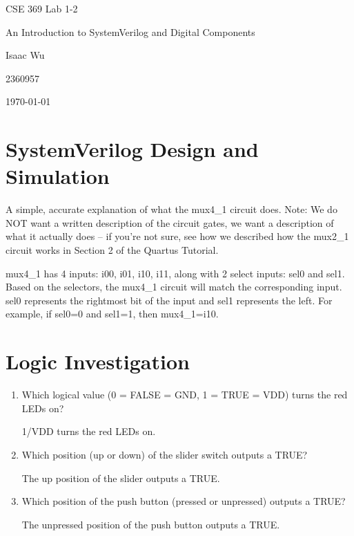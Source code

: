 \documentclass{article}
\date{}
\newenvironment{solution}{\begin{mdframed}[style=SolutionFrame]}{\end{mdframed}}
\begin{document}
    \begin{titlepage}
        \centering
        \null
        \vspace{5cm}
        {\Huge CSE 369 Lab 1-2\par}
        \vspace{0.5cm}
        {\Large An Introduction to SystemVerilog and Digital Components \par}
        \vfill
        {\hfill \Large Isaac Wu \par}
        {\hfill \large 2360957 \par}
        {\hfill \large \today \par}
    \end{titlepage}

\section{SystemVerilog Design and Simulation}
    A simple, accurate explanation of what the mux4\_1 circuit does. Note: We do NOT want a written description of the circuit gates, we want a description of what it actually does – if you're not sure, see how we described how the mux2\_1 circuit works in Section 2 of the Quartus Tutorial.
    \begin{solution}
        mux4\_1 has 4 inputs: i00, i01, i10, i11, along with 2 select inputs: sel0 and sel1. Based on the selectors, the mux4\_1 circuit will match the corresponding input. sel0 represents the rightmost bit of the input and sel1 represents the left. For example, if sel0=0 and sel1=1, then mux4\_1=i10.
    \end{solution}

\section{Logic Investigation}
    \begin{enumerate}
        \item Which logical value (0 = FALSE = GND, 1 = TRUE = VDD) turns the red LEDs on?
            \begin{solution}
                1/VDD turns the red LEDs on.
            \end{solution}
        \item Which position (up or down) of the slider switch outputs a TRUE?
            \begin{solution}
                The up position of the slider outputs a TRUE.
            \end{solution}
        \item Which position of the push button (pressed or unpressed) outputs a TRUE?
            \begin{solution}
                The unpressed position of the push button outputs a TRUE.
            \end{solution}
    \end{enumerate}
\end{document}
